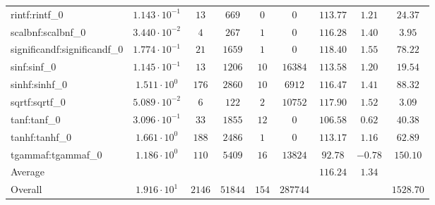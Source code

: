 \begin{tabular}{|l|c|c|c|c|c|c|c|c|}
rintf:rintf\_0               & $ 1.143 \cdot 10^{-1} $ & $ 13     $ & $ 669   $ & $ 0   $ & $ 0      $ & $ 113.77      $ & $ 1.21    $ & $ 24.37   $ \\
scalbnf:scalbnf\_0           & $ 3.440 \cdot 10^{-2} $ & $ 4      $ & $ 267   $ & $ 1   $ & $ 0      $ & $ 116.28      $ & $ 1.40    $ & $ 3.95    $ \\
significandf:significandf\_0 & $ 1.774 \cdot 10^{-1} $ & $ 21     $ & $ 1659  $ & $ 1   $ & $ 0      $ & $ 118.40      $ & $ 1.55    $ & $ 78.22   $ \\
sinf:sinf\_0                 & $ 1.145 \cdot 10^{-1} $ & $ 13     $ & $ 1206  $ & $ 10  $ & $ 16384  $ & $ 113.58      $ & $ 1.20    $ & $ 19.54   $ \\
sinhf:sinhf\_0               & $ 1.511 \cdot 10^{0}  $ & $ 176    $ & $ 2860  $ & $ 10  $ & $ 6912   $ & $ 116.47      $ & $ 1.41    $ & $ 88.32   $ \\
sqrtf:sqrtf\_0               & $ 5.089 \cdot 10^{-2} $ & $ 6      $ & $ 122   $ & $ 2   $ & $ 10752  $ & $ 117.90      $ & $ 1.52    $ & $ 3.09    $ \\
tanf:tanf\_0                 & $ 3.096 \cdot 10^{-1} $ & $ 33     $ & $ 1855  $ & $ 12  $ & $ 0      $ & $ 106.58      $ & $ 0.62    $ & $ 40.38   $ \\
tanhf:tanhf\_0               & $ 1.661 \cdot 10^{0}  $ & $ 188    $ & $ 2486  $ & $ 1   $ & $ 0      $ & $ 113.17      $ & $ 1.16    $ & $ 62.89   $ \\
tgammaf:tgammaf\_0           & $ 1.186 \cdot 10^{0}  $ & $ 110    $ & $ 5409  $ & $ 16  $ & $ 13824  $ & $ 92.78       $ & $ -0.78   $ & $ 150.10  $ \\
\hline
Average                      & $                     $ & $        $ & $       $ & $     $ & $        $ & $ 116.24      $ & $ 1.34    $ & $         $ \\
\hline
Overall                      & $ 1.916 \cdot 10^{1}  $ & $ 2146   $ & $ 51844 $ & $ 154 $ & $ 287744 $ & $             $ & $         $ & $ 1528.70 $ \\
\hline
\end{tabular}
